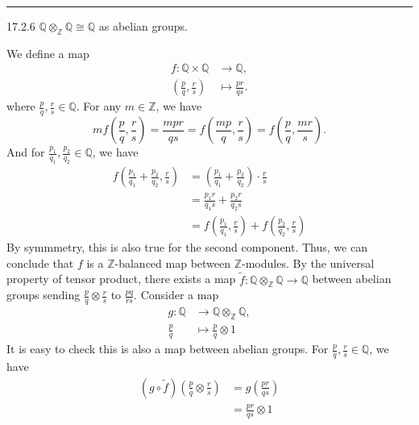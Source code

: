\documentclass[a4paper, 12pt]{article}
\begin{document}
\noindent\rule{7in}{2.8pt}
\begin{problem}{17.2.6}
\(\mathbb{Q}\otimes_{\mathbb{Z}}\mathbb{Q}\cong \mathbb{Q}\) as abelian groups.
\end{problem}
\begin{solution}
We define a map 
\begin{align*}
	f:\mathbb{Q}\times \mathbb{Q}&\rightarrow \mathbb{Q},\\ 
	  (\frac{p}{q},\frac{r}{s})&\mapsto \frac{pr}{qs}.
\end{align*}
where \(\frac{p}{q},\frac{r}{s}\in \mathbb{Q}\). For any \(m\in \mathbb{Z}\), we have 
\[mf(\frac{p}{q},\frac{r}{s})=\frac{mpr}{qs}=f(\frac{mp}{q},\frac{r}{s})=f(\frac{p}{q},\frac{mr}{s}).\]
And for \(\frac{p_1}{q_1},\frac{p_2}{q_2}\in \mathbb{Q}\), we have 
\begin{align*}
f(\frac{p_1}{q_1}+\frac{p_2}{q_2},\frac{r}{s})&=(\frac{p_1}{q_1}+\frac{p_2}{q_2})\cdot \frac{r}{s}\\ 
                                              &=\frac{p_1r}{q_1s}+\frac{p_2r}{q_2s}\\ 
											  &=f(\frac{p_1}{q_1},\frac{r}{s})+f(\frac{p_2}{q_2},\frac{r}{s})
\end{align*}
By symmmetry, this is also true for the second component. Thus, we can conclude that \(f\) is a \(\mathbb{Z}\)-balanced map between \(\mathbb{Z}\)-modules. By the universal property of tensor product, there exists a map 
\(\tilde{f}:\mathbb{Q}\otimes_\mathbb{Z}\mathbb{Q}\rightarrow \mathbb{Q}\) between abelian groups sending \(\frac{p}{q}\otimes \frac{r}{s}\) to \(\frac{pq}{rs}\). Consider a map 
\begin{align*}
	g:\mathbb{Q}&\rightarrow \mathbb{Q}\otimes_\mathbb{Z}\mathbb{Q},\\ 
	  \frac{p}{q}&\mapsto \frac{p}{q}\otimes 1
\end{align*}
It is easy to check this is also a map between abelian groups. For \(\frac{p}{q}, \frac{r}{s}\in \mathbb{Q}\), we have 
\begin{align*}
	(g\circ \tilde{f})(\frac{p}{q}\otimes \frac{r}{s})&=g(\frac{pr}{qs})\\ 
	                                          &=\frac{pr}{qs}\otimes 1\\ 

\end{align*}
\end{solution}
\end{document}
